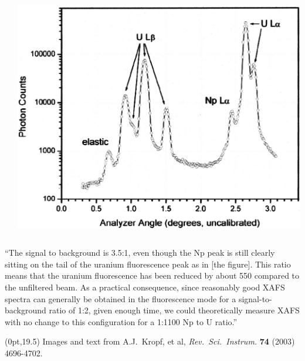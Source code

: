 \documentclass[10pt, xcolor=x11names, compress]{beamer}
\begin{document}
\begin{frame}
\begin{columns}
\begin{column}{0.35\linewidth}
    \end{column}
    \begin{column}{0.35\linewidth}
      \includegraphics[width=0.9\linewidth]{pses/hires/unp.png}      
    \end{column}
  \end{columns}
  
  \bigskip

  \scriptsize
  ``The signal to background is 3.5:1, even though the Np peak is
  still clearly sitting on the tail of the uranium fluorescence peak
  as in [the figure]. This ratio means that the uranium fluorescence
  has been reduced by about 550 compared to the unfiltered beam. As a
  practical consequence, since reasonably good XAFS spectra can
  generally be obtained in the fluorescence mode for a
  signal-to-background ratio of 1:2, \alert{given enough time}, we could
  theoretically measure XAFS with no change to this configuration for
  a 1:1100 Np to U ratio.''
  \begin{textblock*}{0.6\linewidth}(0pt,19.5\TPVertModule)
    \tiny
    Images and text from A.J.\ Kropf, et al,
    \textit{Rev.\ Sci.\ Instrum.} \textbf{74} (2003) 4696-4702.
  \end{textblock*}
\end{frame}
\end{document}
